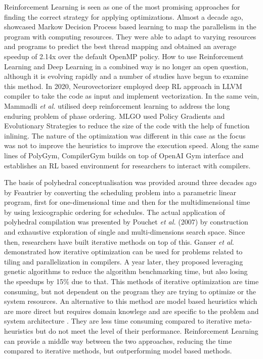 \documentclass[logo,msc]{infthesis}           %
\begin{document}
Reinforcement Learning is seen as one of the most promising approaches for finding the correct strategy for applying optimizations\cite{9232934}. Almost a decade ago, \cite{10.1007} showcased Markow Decision Process based learning to map the parallelism in the program with computing resources. They were able to adapt to varying resources and programs to predict the best thread mapping and obtained an average speedup of 2.14x over the default OpenMP policy. How to use Reinforcement Learning and Deep Learning in a combined way is no longer an open question, although it is evolving rapidly and a number of studies have begun to examine this method. In 2020, Neurovectorizer \cite{NeuroVectorizer} employed deep RL approach in LLVM compiler to take the code as input and implement vectorization. In the same vein,  Mammadli \textit{et al.} 
utilised deep reinforcement learning to address the long enduring problem of phase ordering. MLGO \cite{10.48550} used Policy Gradients and Evolutionary Strategies to reduce the size of the code with the help of function inlining. The nature of the optimization was different in this case as the focus was not to improve the heuristics to improve the execution speed.  Along the same lines of PolyGym, CompilerGym \cite{CompilerGym} builds on top of OpenAI Gym interface and establishes an RL based environment for researchers to interact with compilers.

The basis of polyhedral conceptualisation was provided around three decades ago by Feautrier by converting the scheduling problem into a parametric linear program, first for one-dimensional time\cite{single} and then for the multidimensional time by using lexicographic ordering for schedules\cite{multi}. The actual application of polyhedral compilation was presented by Pouchet \textit{et al.} (2007) by construction and exhaustive exploration of single\cite{it_Single} and multi-dimensions\cite{it_multi} search space. Since then, researchers have built iterative methods on top of this. Ganser \textit{et al.} demonstrated how iterative optimization can be used for problems related to tiling and parallelization in compilers\cite{10.1145/3109482}. A year later, they proposed leveraging genetic algorithms to reduce the algorithm benchmarking time, but also losing the speedups by 15\% due to that. This methods of iterative optimization are time consuming, but not dependent on the program they are trying to optimize or the system resources. An alternative to this method are model based heuristics which are more direct but requires domain knowlege and are specific to the problem and system architecture\cite{Bondhugula07pluto:a} \cite{isl}. They are less time consuming compared to iterative meta-heuristics but do not meet the level of their performance. Reinforcement Learning can provide a middle way between the two approaches, reducing the time compared to iterative methods, but outperforming model based methods. 
\end{document}
